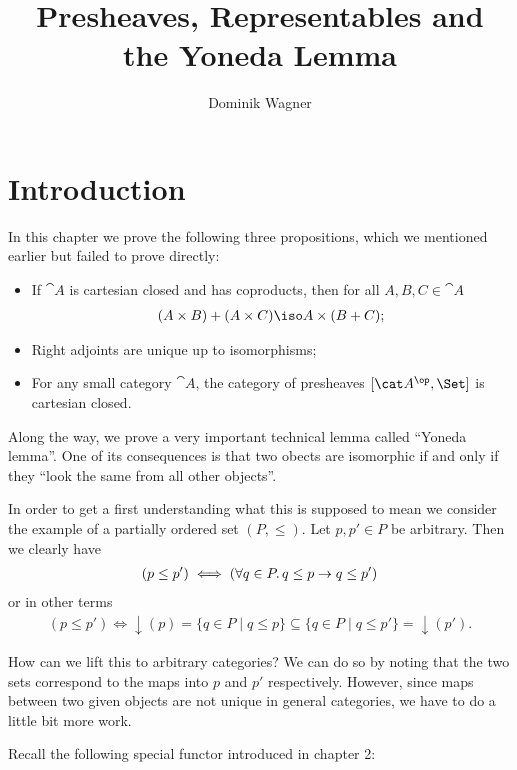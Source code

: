 \documentclass{article}
\theoremstyle{definition}
\numberwithin{equation}{section}
\begin{document}
\title{Presheaves, Representables and\\the Yoneda Lemma}
\author{Dominik Wagner}
\maketitle

\section{Introduction}
In this chapter we prove the following three propositions, which we mentioned earlier but failed to prove directly:
\begin{itemize}
\item If $\cat A$ is cartesian closed and has coproducts, then for all $A,B,C\in\cat A$
  \begin{align*}
    (A\times B)+(A\times C)\iso A\times (B+C);
  \end{align*}
\item Right adjoints are unique up to isomorphisms;
\item For any small category $\cat A$, the category of presheaves $[\cat A^\op,\Set]$ is cartesian closed.
\end{itemize}
Along the way, we prove a very important technical lemma called ``Yoneda lemma''. One of its consequences is that two obects are isomorphic if and only if they ``look the same from all other objects''.

In order to get a first understanding what this is supposed to mean we consider the example of a partially ordered set $(P,\leq)$. Let $p,p'\in P$ be arbitrary. Then we clearly have 
\begin{align*}
  (p\leq p')\iff (\forall q\in P\ldotp q\leq p\rightarrow q\leq p')
\end{align*}
or in other terms
\begin{align}
  \label{eq:pre}
  (p\leq p')\iff {\downarrow}(p)=\{q\in P\mid q\leq p\}\subseteq \{q\in P\mid q\leq p'\}={\downarrow}(p').
\end{align}

How can we lift this to arbitrary categories? We can do so by noting that the two sets correspond to the maps into $p$ and $p'$ respectively. However, since maps between two given objects are not unique in general categories, we have to do a little bit more work. 

Recall the following special functor introduced in chapter 2: 
\end{document}
